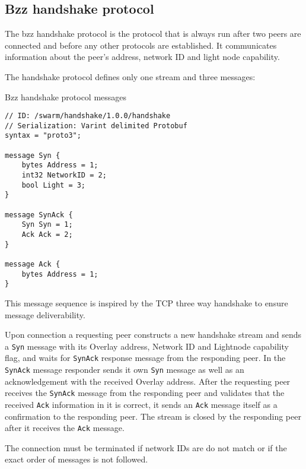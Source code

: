 \subsection{Bzz handshake protocol \statusgreen}\label{spec:protocol:bzz}

The bzz handshake protocol is the protocol that is always run after two peers are connected and before any other protocols are established. It communicates information about the  peer's address, network ID and light node capability.

The handshake protocol defines only one stream and three messages:

\begin{definition}{Bzz handshake protocol  messages}\label{def:bzz-messages}

\begin{lstlisting}
// ID: /swarm/handshake/1.0.0/handshake
// Serialization: Varint delimited Protobuf
syntax = "proto3";

message Syn {
    bytes Address = 1;
    int32 NetworkID = 2;
    bool Light = 3;
}

message SynAck {
    Syn Syn = 1;
    Ack Ack = 2;
}

message Ack {
    bytes Address = 1;
}
\end{lstlisting}
\end{definition}

This message sequence is inspired by the TCP three way handshake to ensure message deliverability.

Upon connection a requesting peer constructs a new handshake stream and sends a \lstinline{Syn} message with its Overlay address, Network ID and Lightnode capability flag, and waits for \lstinline{SynAck} response message from the responding peer. In  the  \lstinline{SynAck} message responder sends it own \lstinline{Syn} message as well as an acknowledgement with the received Overlay address. After the requesting peer receives the \lstinline{SynAck} message from the responding peer and validates that the received \lstinline{Ack} information in it is correct, it sends an \lstinline{Ack} message itself as a confirmation to the responding peer. The stream is closed by the responding peer after it receives the \lstinline{Ack} message.

The connection must be terminated if network IDs are do not match or if the  exact  order of messages is not followed.

